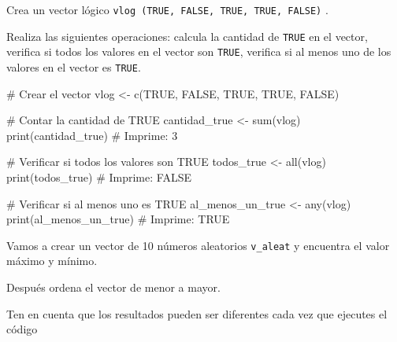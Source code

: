 \documentclass[
  letterpaper,
]{scrbook}
\newenvironment{Shaded}{\begin{snugshade}}{\end{snugshade}}
\newcommand{\CommentTok}[1]{\textcolor[rgb]{0.37,0.37,0.37}{#1}}
\newcommand{\ConstantTok}[1]{\textcolor[rgb]{0.56,0.35,0.01}{#1}}
\newcommand{\FunctionTok}[1]{\textcolor[rgb]{0.28,0.35,0.67}{#1}}
\newcommand{\NormalTok}[1]{\textcolor[rgb]{0.00,0.23,0.31}{#1}}
\newcommand{\OtherTok}[1]{\textcolor[rgb]{0.00,0.23,0.31}{#1}}
\begin{document}
Crea un vector lógico
\texttt{vlog\ (TRUE,\ FALSE,\ TRUE,\ TRUE,\ FALSE)} .

Realiza las siguientes operaciones: calcula la cantidad de \texttt{TRUE}
en el vector, verifica si todos los valores en el vector son
\texttt{TRUE}, verifica si al menos uno de los valores en el vector es
\texttt{TRUE}.

\begin{Shaded}
\begin{Highlighting}[]
\CommentTok{\# Crear el vector}
\NormalTok{vlog }\OtherTok{\textless{}{-}} \FunctionTok{c}\NormalTok{(}\ConstantTok{TRUE}\NormalTok{, }\ConstantTok{FALSE}\NormalTok{, }\ConstantTok{TRUE}\NormalTok{, }\ConstantTok{TRUE}\NormalTok{, }\ConstantTok{FALSE}\NormalTok{)}

\CommentTok{\# Contar la cantidad de TRUE}
\NormalTok{cantidad\_true }\OtherTok{\textless{}{-}} \FunctionTok{sum}\NormalTok{(vlog)}
\FunctionTok{print}\NormalTok{(cantidad\_true)  }\CommentTok{\# Imprime: 3}

\CommentTok{\# Verificar si todos los valores son TRUE}
\NormalTok{todos\_true }\OtherTok{\textless{}{-}} \FunctionTok{all}\NormalTok{(vlog)}
\FunctionTok{print}\NormalTok{(todos\_true)  }\CommentTok{\# Imprime: FALSE}

\CommentTok{\# Verificar si al menos uno es TRUE}
\NormalTok{al\_menos\_un\_true }\OtherTok{\textless{}{-}} \FunctionTok{any}\NormalTok{(vlog)}
\FunctionTok{print}\NormalTok{(al\_menos\_un\_true)  }\CommentTok{\# Imprime: TRUE}
\end{Highlighting}
\end{Shaded}

Vamos a crear un vector de 10 números aleatorios \texttt{v\_aleat} y
encuentra el valor máximo y mínimo.

Después ordena el vector de menor a mayor.

Ten en cuenta que los resultados pueden ser diferentes cada vez que
ejecutes el código
\end{document}
